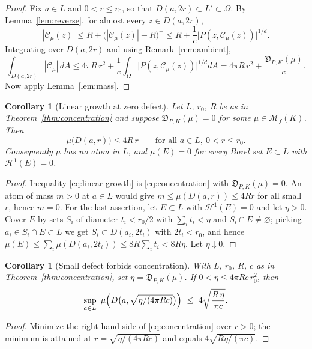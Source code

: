 \documentclass[10pt,a4paper]{amsart}
\newtheorem{corollary}[theorem]{Corollary}
\newcommand{\M}{\mathcal M}
\newcommand{\Cauchy}{\mathcal C}
\newcommand{\Hone}{\mathcal H^1}
\begin{document}
\begin{proof}
Fix $a\in L$ and $0<r\leq r_0$, so that $D(a,2r)\subset L'\subset\Omega$.  By
Lemma~\ref{lem:reverse}, for almost every $z\in D(a,2r)$,
\[
 |\Cauchy_\mu(z)|
 \leq R+\bigl(|\Cauchy_\mu(z)|-R\bigr)^{+}
 \leq R+\frac1c\bigl|P(z,\Cauchy_\mu(z))\bigr|^{1/d} .
\]
Integrating over $D(a,2r)$ and using Remark~\ref{rem:ambient},
\[
 \int_{D(a,2r)}|\Cauchy_\mu|\,dA
 \leq 4\pi R\,r^2+\frac1c\int_\Omega\bigl|P(z,\Cauchy_\mu(z))\bigr|^{1/d}dA
 =4\pi R\,r^2+\frac{\mathfrak D_{P,K}(\mu)}{c}.
\]
Now apply Lemma~\ref{lem:mass}.
\end{proof}

\begin{corollary}[Linear growth at zero defect]\label{cor:linear-growth}
Let $L$, $r_0$, $R$ be as in Theorem~\ref{thm:concentration} and suppose
$\mathfrak D_{P,K}(\mu)=0$ for some $\mu\in\M_f(K)$.  Then
\begin{equation}\label{eq:linear-growth}
 \mu\bigl(D(a,r)\bigr)\leq 4R\,r
 \qquad\text{for all }a\in L,\ 0<r\leq r_0 .
\end{equation}
Consequently $\mu$ has no atom in $L$, and $\mu(E)=0$ for every Borel set
$E\subset L$ with $\Hone(E)=0$.
\end{corollary}

\begin{proof}
Inequality \eqref{eq:linear-growth} is \eqref{eq:concentration} with
$\mathfrak D_{P,K}(\mu)=0$.  An atom of mass $m>0$ at $a\in L$ would give
$m\leq\mu(D(a,r))\leq4Rr$ for all small $r$, hence $m=0$.  For the last
assertion, let $E\subset L$ with $\Hone(E)=0$ and let $\eta>0$.  Cover $E$ by
sets $S_i$ of diameter $t_i<r_0/2$ with $\sum_it_i<\eta$ and $S_i\cap E\neq
\varnothing$; picking $a_i\in S_i\cap E\subset L$ we get $S_i\subset
D(a_i,2t_i)$ with $2t_i<r_0$, and hence
$\mu(E)\leq\sum_i\mu(D(a_i,2t_i))\leq8R\sum_it_i<8R\eta$.  Let $\eta\downarrow0$.
\end{proof}

\begin{corollary}[Small defect forbids concentration]\label{cor:small-defect}
With $L$, $r_0$, $R$, $c$ as in Theorem~\ref{thm:concentration}, set
$\eta=\mathfrak D_{P,K}(\mu)$.  If $0<\eta\leq4\pi Rc\,r_0^2$, then
\[
 \sup_{a\in L}\ \mu\Bigl(D\bigl(a,\sqrt{\eta/(4\pi Rc)}\bigr)\Bigr)
 \ \leq\ 4\sqrt{\frac{R\,\eta}{\pi c}} .
\]
\end{corollary}

\begin{proof}
Minimize the right-hand side of \eqref{eq:concentration} over $r>0$; the minimum
is attained at $r=\sqrt{\eta/(4\pi Rc)}$ and equals $4\sqrt{R\eta/(\pi c)}$.
\end{proof}
\end{document}
